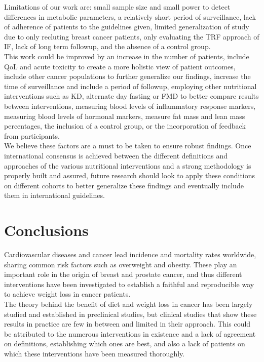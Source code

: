 \documentclass[journal,article,submit,pdftex,moreauthors]{Definitions/mdpi}
\begin{document}
{\color{blue}Limitations of our work are: small sample size and small power to detect differences in metabolic parameters, a relatively short period of surveillance, lack of adherence of patients to the guidelines given, limited generalization of study due to only recluting breast cancer patients, only evaluating the TRF approach of IF, lack of long term followup, and the absence of a control group.\\

This work could be improved by an increase in the number of patients, include QoL and acute toxicity to create a more holistic view of patient outcomes, include other cancer populations to further generalize our findings, increase the time of surveillance and include a period of followup, employing other nutritional interventions such as KD, alternate day fasting or FMD to better compare results between interventions, measuring blood levels of inflammatory response markers, measuring blood levels of hormonal markers, measure fat mass and lean mass percentages, the inclusion of a control group, or the incorporation of feedback from participants.\\

We believe these factors are a must to be taken to ensure robust findings. Once international consensus is achieved between the different definitions and approaches of the various nutritional interventions and a strong methodology is properly built and assured, future research should look to apply these conditions on different cohorts to better generalize these findings and eventually include them in international guidelines.}


\section{Conclusions}

Cardiovascular diseases and cancer lead incidence and mortality rates worldwide, sharing common risk factors such as overweight and obesity. These play an important role in the origin of breast and prostate cancer, and thus different interventions have been investigated to establish a faithful and reproducible way {\color{blue}to achieve weight loss} in cancer patients.\\

The theory behind the benefit of diet and weight loss in cancer has been largely studied and established in preclinical studies, but clinical studies that show these results in practice are few in between and limited in their approach. This could be attributed to the numerous interventions in existence and a lack of agreement on definitions, establishing which ones are best, and also a lack of patients on which these interventions have been measured thoroughly.\\
\end{document}
